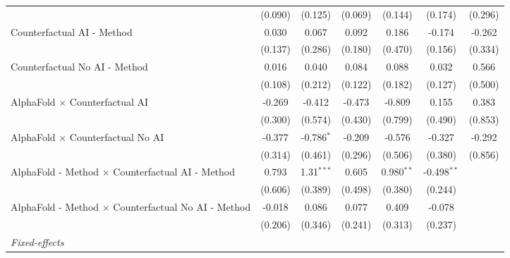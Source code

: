\begin{tabular}{lcccccc}
                                                              & (0.090)      & (0.125)       & (0.069)       & (0.144)       & (0.174)       & (0.296)\\   
   Counterfactual AI - Method                                 & 0.030        & 0.067         & 0.092         & 0.186         & -0.174        & -0.262\\   
                                                              & (0.137)      & (0.286)       & (0.180)       & (0.470)       & (0.156)       & (0.334)\\   
   Counterfactual No AI - Method                              & 0.016        & 0.040         & 0.084         & 0.088         & 0.032         & 0.566\\   
                                                              & (0.108)      & (0.212)       & (0.122)       & (0.182)       & (0.127)       & (0.500)\\   
   AlphaFold $\times$ Counterfactual AI                       & -0.269       & -0.412        & -0.473        & -0.809        & 0.155         & 0.383\\   
                                                              & (0.300)      & (0.574)       & (0.430)       & (0.799)       & (0.490)       & (0.853)\\   
   AlphaFold $\times$ Counterfactual No AI                    & -0.377       & -0.786$^{*}$  & -0.209        & -0.576        & -0.327        & -0.292\\   
                                                              & (0.314)      & (0.461)       & (0.296)       & (0.506)       & (0.380)       & (0.856)\\   
   AlphaFold - Method $\times$ Counterfactual AI - Method     & 0.793        & 1.31$^{***}$  & 0.605         & 0.980$^{**}$  & -0.498$^{**}$ &   \\   
                                                              & (0.606)      & (0.389)       & (0.498)       & (0.380)       & (0.244)       &   \\   
   AlphaFold - Method $\times$ Counterfactual No AI - Method  & -0.018       & 0.086         & 0.077         & 0.409         & -0.078        &   \\   
                                                              & (0.206)      & (0.346)       & (0.241)       & (0.313)       & (0.237)       &   \\   
   \midrule
   \emph{Fixed-effects}\\

\end{tabular}
